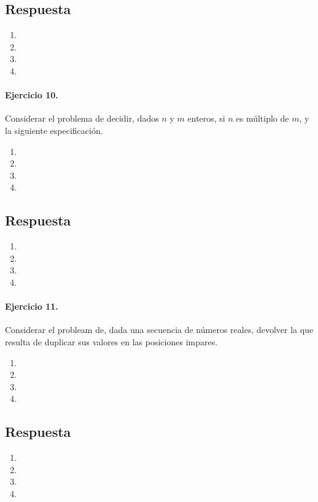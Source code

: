 \documentclass[a4paper]{article}
\begin{document}
\subsection*{Respuesta}
	\begin{enumerate}[label=\alph*)]
		\item
		\item
		\item
		\item
	\end{enumerate}
	
\paragraph*{Ejercicio 10.} Considerar el problema de decidir, dados $n$ y $m$ enteros, si $n$ es múltiplo de $m$, y la siguiente especificación.
	\begin{enumerate}[label=\alph*)]
		\item
		\item
		\item
		\item
	\end{enumerate}
\subsection*{Respuesta}
	\begin{enumerate}[label=\alph*)]
		\item
		\item
		\item
		\item
	\end{enumerate}

\paragraph*{Ejercicio 11.} Considerar el probleam de, dada una secuencia de números reales, devolver la que resulta de duplicar sus valores en las posiciones impares.
	\begin{enumerate}[label=\alph*)]
		\item
		\item
		\item
		\item
	\end{enumerate}
\subsection*{Respuesta}
	\begin{enumerate}[label=\alph*)]
		\item
		\item
		\item
		\item
	\end{enumerate}
	
\end{document}
